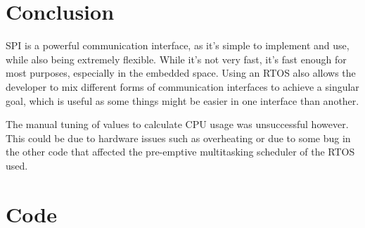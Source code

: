 \documentclass{article}
\begin{document}
\section{Conclusion}
SPI is a powerful communication interface, as it's simple to implement and use, while also being extremely flexible. While it's not very fast, it's fast enough for most purposes, especially in the embedded space. Using an RTOS also allows the developer to mix different forms of communication interfaces to achieve a singular goal, which is useful as some things might be easier in one interface than another.

The manual tuning of values to calculate CPU usage was unsuccessful however. This could be due to hardware issues such as overheating or due to some bug in the other code that affected the pre-emptive multitasking scheduler of the RTOS used.
\newpage
\appendix
\section{Code}
\inputminted{C}{SPI_main.c}

\end{document}

